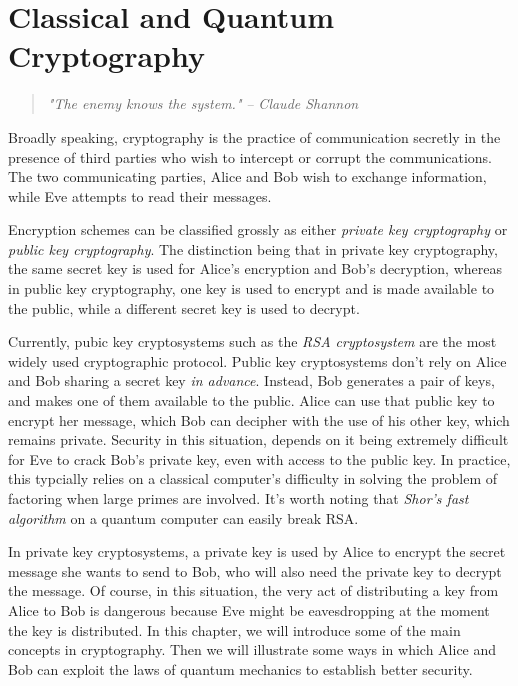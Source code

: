 
\chapter{Classical and Quantum Cryptography} %

\label{Chapter5-cryptography} %


\begin{quote}
\textit{"The enemy knows the system."} 
\bigskip
\hfill \textit{-- Claude Shannon}
\end{quote}

Broadly speaking, cryptography is the practice of communication secretly in the presence of third parties who wish to intercept or corrupt the communications. The two communicating parties, Alice and Bob wish to exchange information, while Eve attempts to read their messages.

Encryption schemes can be classified grossly as either \emph{private key cryptography} or \emph{public key cryptography}. The distinction being that in private key cryptography, the same secret key is used for Alice's encryption and Bob's decryption, whereas in public key cryptography, one key is used to encrypt and is made available to the public, while a different secret key is used to decrypt.

Currently, pubic key cryptosystems such as the \emph{RSA cryptosystem} are the most widely used cryptographic protocol.  Public key cryptosystems don't rely on Alice and Bob sharing a secret key {\emph{in advance}}. Instead, Bob generates a pair of keys, and makes one of them available to the public. Alice can use that public key to encrypt her message, which Bob can decipher with the use of his other key, which remains private. Security in this situation, depends on it being extremely difficult for Eve to crack Bob's private key, even with access to the public key.  In practice, this typcially relies on a classical computer's difficulty in solving the problem of factoring when large primes are involved. It's worth noting that {\emph{Shor's fast algorithm}} on a quantum computer can easily break RSA.

In private key cryptosystems, a private key is used by Alice to encrypt the secret message she wants to send to Bob, who will also need the private key to decrypt the message. Of course, in this situation, the very act of distributing a key from Alice to Bob is dangerous because Eve might be eavesdropping at the moment the key is distributed. In this chapter, we will introduce some of the main concepts in cryptography.  Then we will illustrate some ways in which Alice and Bob can exploit the laws of quantum mechanics to establish better security. 

